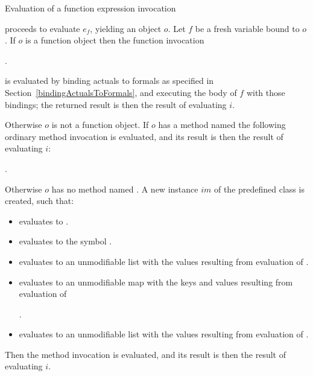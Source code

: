 \documentclass[makeidx]{article}
\begin{document}
\LMHash{}%
Evaluation of a function expression invocation


\noindent
proceeds to evaluate $e_f$, yielding an object $o$.
Let $f$ be a fresh variable bound to $o$.
If $o$ is a function object then the function invocation

.

is evaluated by binding actuals to formals as specified in Section~\ref{bindingActualsToFormals},
and executing the body of $f$ with those bindings;
the returned result is then the result of evaluating $i$.

\LMHash{}%
Otherwise $o$ is not a function object.
If $o$ has a method named \CALL{}
the following ordinary method invocation is evaluated,
and its result is then the result of evaluating $i$:

.

\LMHash{}%
Otherwise $o$ has no method named \CALL{}.
A new instance $im$ of the predefined class  is created, such that:
\begin{itemize}
\item {} evaluates to \code{\TRUE{}}.
\item {} evaluates to the symbol .
\item {} evaluates to an unmodifiable list with the values
resulting from evaluation of
.
\item {} evaluates to an unmodifiable map
with the keys and values resulting from evaluation of

.
\item {} evaluates to an unmodifiable list
with the values resulting from evaluation of
.
\end{itemize}

\LMHash{}%
Then the method invocation  is evaluated,
and its result is then the result of evaluating $i$.

\end{document}

